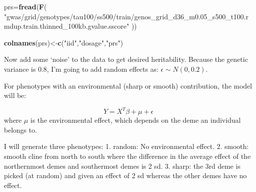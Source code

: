 \documentclass[]{article}
\newenvironment{Shaded}{\begin{snugshade}}{\end{snugshade}}
\newcommand{\KeywordTok}[1]{\textcolor[rgb]{0.13,0.29,0.53}{\textbf{#1}}}
\newcommand{\NormalTok}[1]{#1}
\newcommand{\StringTok}[1]{\textcolor[rgb]{0.31,0.60,0.02}{#1}}
\begin{document}
\begin{Shaded}
\begin{Highlighting}[]
\NormalTok{prs=}\KeywordTok{fread}\NormalTok{(}\KeywordTok{F}\NormalTok{(}
  \StringTok{"gwas/grid/genotypes/tau100/ss500/train/genos_grid_d36_m0.05_s500_t100.rmdup.train.thinned_100kb.gvalue.sscore"}
\NormalTok{))}

\KeywordTok{colnames}\NormalTok{(prs)<-}\KeywordTok{c}\NormalTok{(}\StringTok{"iid"}\NormalTok{,}\StringTok{"dosage"}\NormalTok{,}\StringTok{"prs"}\NormalTok{)}
\end{Highlighting}
\end{Shaded}

Now add some `noise' to the data to get desired heritability. Because
the genetic variance is 0.8, I'm going to add random effects as:
\(\epsilon \sim N(0,0.2)\).

For phenotypes with an environmental (sharp or smooth) contribution, the
model will be:

\[Y = X^T\beta + \mu  + \epsilon\] where \(\mu\) is the environmental
effect, which depends on the deme an individual belongs to.

I will generate three phenotypes: 1. random: No environmental effect. 2.
smooth: smooth cline from north to south where the difference in the
average effect of the northernmost demes and southermost demes is 2 sd.
3. sharp: the 3rd deme is picked (at random) and given an effect of 2 sd
whereas the other demes have no effect.
\end{document}
